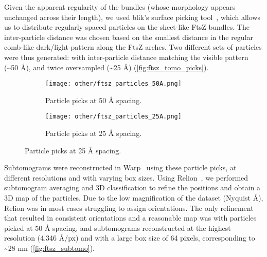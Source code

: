 Given the apparent regularity of the bundles (whose morphology appears unchanged across their length), we used blik's surface picking tool~\cite{gaifasBlikExtensible3D2024,gaifasBlikPythonTool2024}, which allows us to distribute regularly spaced particles on the sheet-like FtsZ bundles.
The inter-particle distance was chosen based on the smallest distance in the regular comb-like dark/light pattern along the FtsZ arches. %
Two different sets of particles were thus generated: with inter-particle distance matching the visible pattern (\sim50 Å), and twice oversampled (\sim25 Å) (\autoref{fig:ftsz_tomo_picks}).

\begin{figure}[ht]
    \centering
    \begin{subfigure}[B]{.49\textwidth}
        \centering
        \texttt{[image: other/ftsz\_particles\_50A.png]}
        \caption{Particle picks at 50 Å spacing.}
        \label{fig:ftsz_tomo_picks_50}
    \end{subfigure}%
    \hfill
    \begin{subfigure}[B]{.49\textwidth}
        \centering
        \texttt{[image: other/ftsz\_particles\_25A.png]}
        \caption{Particle picks at 25 Å spacing.}
        \label{fig:ftsz_tomo_picks_25}
    \end{subfigure}%
    \label{fig:ftsz_tomo_picks}
\end{figure}

Subtomograms were reconstructed in Warp~\cite{tegunovRealtimeCryoelectronMicroscopy2019} using these particle picks, at different resolutions and with varying box sizes.
Using Relion~\cite{scheresRELIONImplementationBayesian2012,zivanovBayesianApproachSingleparticle2022,burtImageProcessingPipeline2024}, we performed subtomogram averaging and 3D classification to refine the positions and obtain a 3D map of the particles.
Due to the low magnification of the dataset (Nyquist  Å), Relion was in most cases struggling to assign orientations.
The only refinement that resulted in consistent orientations and a reasonable map was with particles picked at 50 Å spacing, and subtomograms reconstructed at the highest resolution (4.346 Å/px) and with a large box size of 64 pixels, corresponding to \sim28 nm (\autoref{fig:ftsz_subtomo}).

